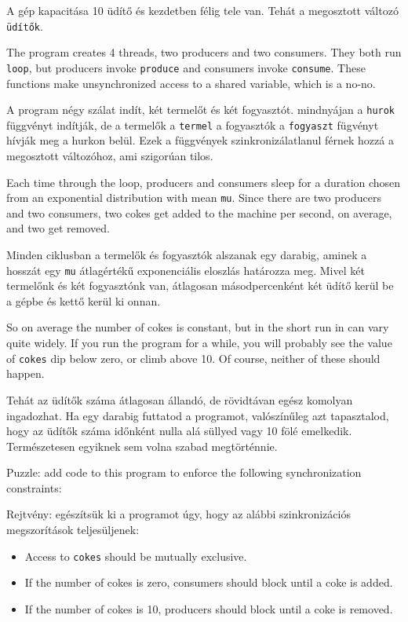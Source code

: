 \documentclass{book}
\begin{document}
A gép kapacitása 10 üdítő és kezdetben félig tele van.
Tehát a megosztott változó {\tt üdítők}.

The program creates 4 threads, two producers and two consumers.
They both run {\tt loop}, but producers invoke {\tt produce}
and consumers invoke {\tt consume}.  These functions make
unsynchronized access to a shared variable, which is a no-no.

A program négy szálat indít, két termelőt és két fogyasztót.
mindnyájan a {\tt hurok} függvényt indítják, de a termelők
a {\tt termel} a fogyasztók a {\tt fogyaszt} fügvényt hívják meg
a hurkon belül. Ezek a függvények szinkronizálatlanul férnek
hozzá a megosztott változóhoz, ami szigorúan tilos.

Each time through the loop, producers and consumers sleep for a
duration chosen from an exponential distribution with mean {\tt mu}.
Since there are two producers and two consumers, two cokes get added
to the machine per second, on average, and two get removed.

Minden ciklusban a termelők és fogyasztók alszanak egy darabig,
aminek a hosszát egy {\tt mu} átlagértékű exponenciális eloszlás
határozza meg. Mivel két termelőnk és két fogyasztónk van, átlagosan
másodpercenként két üdítő kerül be a gépbe és kettő kerül ki onnan.

So on average the number of cokes is constant, but in the short
run in can vary quite widely.  If you run the program for a
while, you will probably see the value of {\tt cokes} dip
below zero, or climb above 10.  Of course, neither of these
should happen.

Tehát az üdítők száma átlagosan állandó, de rövidtávan egész
komolyan ingadozhat. Ha egy darabig futtatod a programot,
valószínűleg azt tapasztalod, hogy az üdítők száma időnként
nulla alá süllyed vagy 10 fölé emelkedik. Természetesen
egyiknek sem volna szabad megtörténnie.

Puzzle: add code to this program to enforce the following
synchronization constraints:

Rejtvény: egészítsük ki a programot úgy, hogy az alábbi
szinkronizációs megszorítások teljesüljenek:

\begin{itemize}

\item Access to {\tt cokes} should be mutually exclusive.

\item If the number of cokes is zero, consumers should block
until a coke is added.

\item If the number of cokes is 10, producers should block
until a coke is removed.

\end{itemize}
\end{document}
